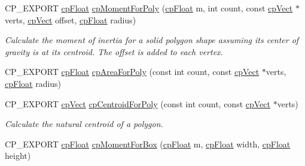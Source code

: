 \begin{DoxyCompactItemize}
\mbox{\label{group__misc_gaa69a0e62a94f55c347eb66160963ff6e}} 
C\+P\+\_\+\+E\+X\+P\+O\+RT \mbox{\hyperlink{group__basic_types_gac1ed65573e035bf892505768c852d8d3}{cp\+Float}} \mbox{\hyperlink{group__misc_gaa69a0e62a94f55c347eb66160963ff6e}{cp\+Moment\+For\+Poly}} (\mbox{\hyperlink{group__basic_types_gac1ed65573e035bf892505768c852d8d3}{cp\+Float}} m, int count, const \mbox{\hyperlink{structcp_vect}{cp\+Vect}} $\ast$verts, \mbox{\hyperlink{structcp_vect}{cp\+Vect}} offset, \mbox{\hyperlink{group__basic_types_gac1ed65573e035bf892505768c852d8d3}{cp\+Float}} radius)
\begin{DoxyCompactList}\small\item\em Calculate the moment of inertia for a solid polygon shape assuming it\textquotesingle{}s center of gravity is at it\textquotesingle{}s centroid. The offset is added to each vertex. \end{DoxyCompactList}\item 
C\+P\+\_\+\+E\+X\+P\+O\+RT \mbox{\hyperlink{group__basic_types_gac1ed65573e035bf892505768c852d8d3}{cp\+Float}} \mbox{\hyperlink{group__misc_ga2bc17e58f105411e2d66c09f8047d822}{cp\+Area\+For\+Poly}} (const int count, const \mbox{\hyperlink{structcp_vect}{cp\+Vect}} $\ast$verts, \mbox{\hyperlink{group__basic_types_gac1ed65573e035bf892505768c852d8d3}{cp\+Float}} radius)
\item 
\mbox{\label{group__misc_gaedd18beae9cbd2b6847747cc1d933bfd}} 
C\+P\+\_\+\+E\+X\+P\+O\+RT \mbox{\hyperlink{structcp_vect}{cp\+Vect}} \mbox{\hyperlink{group__misc_gaedd18beae9cbd2b6847747cc1d933bfd}{cp\+Centroid\+For\+Poly}} (const int count, const \mbox{\hyperlink{structcp_vect}{cp\+Vect}} $\ast$verts)
\begin{DoxyCompactList}\small\item\em Calculate the natural centroid of a polygon. \end{DoxyCompactList}\item 
\mbox{\label{group__misc_ga840facfe3f57151e1a8634b6047a45ef}} 
C\+P\+\_\+\+E\+X\+P\+O\+RT \mbox{\hyperlink{group__basic_types_gac1ed65573e035bf892505768c852d8d3}{cp\+Float}} \mbox{\hyperlink{group__misc_ga840facfe3f57151e1a8634b6047a45ef}{cp\+Moment\+For\+Box}} (\mbox{\hyperlink{group__basic_types_gac1ed65573e035bf892505768c852d8d3}{cp\+Float}} m, \mbox{\hyperlink{group__basic_types_gac1ed65573e035bf892505768c852d8d3}{cp\+Float}} width, \mbox{\hyperlink{group__basic_types_gac1ed65573e035bf892505768c852d8d3}{cp\+Float}} height)

\end{DoxyCompactItemize}
